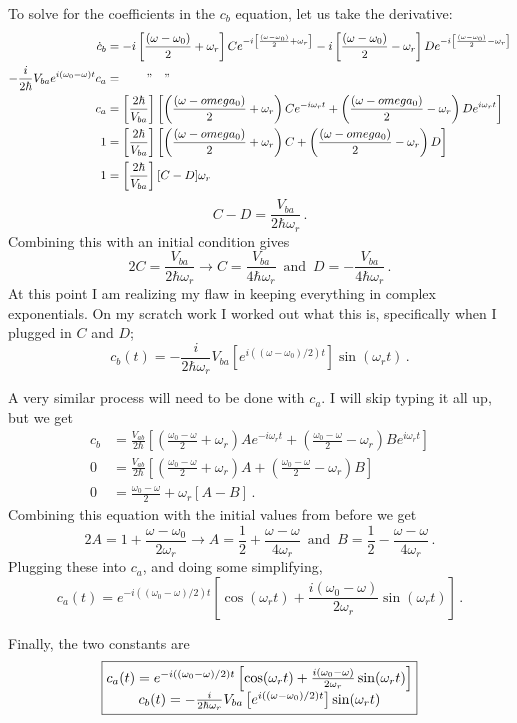 \documentclass[11pt]{article}
\begin{document}
\begin{enumerate}[label=\alph*)]
To solve for the coefficients in the $c_b$ equation, let us take the derivative: 
\begin{align*}
\dot{c}_b & = -i\left[\frac{(\omega - \omega_0)}{2} + \omega_r\right]Ce^{-i\left[\frac{(\omega - \omega_0)}{2} + \omega_r\right]} -i\left[\frac{(\omega - \omega_0)}{2} - \omega_r\right]De^{-i\left[\frac{(\omega - \omega_0)}{2} - \omega_r\right]}\\
-\frac{i}{2\hbar}V_{ba}e^{i(\omega_0-\omega)t}c_a & = \qquad " \quad "\\
c_a & = \left[\frac{2\hbar}{V_{ba}}\right]\left[\left(\frac{(\omega-omega_0)}{2} + \omega_r\right)Ce^{-i\omega_r t} + \left(\frac{(\omega-omega_0)}{2} - \omega_r\right)De^{i\omega_r t}\right]\\
1 & = \left[\frac{2\hbar}{V_{ba}}\right]\left[\left(\frac{(\omega-omega_0)}{2} + \omega_r\right)C + \left(\frac{(\omega-omega_0)}{2} - \omega_r\right)D\right]\\
1 & = \left[\frac{2\hbar}{V_{ba}}\right][C-D]\omega_r
\end{align*}
\[C - D = \frac{V_{ba}}{2\hbar \omega_r} \, .\]
Combining this with an initial condition gives
\[2C = \frac{V_{ba}}{2\hbar \omega_r} \rightarrow C = \frac{V_{ba}}{4\hbar \omega_r} \, \text{ and } \, D = -\frac{V_{ba}}{4\hbar \omega_r} \, .\]
At this point I am realizing my flaw in keeping everything in complex exponentials. On my scratch work I worked out what this is, specifically when I plugged in $C$ and $D$; 
\[c_b(t)  = -\frac{i}{2\hbar \omega_r}V_{ba} \left[e^{i((\omega-\omega_0)/2)t}\right]\sin(\omega_r t) \, .\]

A very similar process will need to be done with $c_a$. I will skip typing it all up, but we get
\begin{align*}
c_b & = \frac{V_{ab}}{2\hbar}\left[\left(\frac{\omega_0 - \omega}{2} + \omega_r\right)Ae^{-i\omega_r t} + \left(\frac{\omega_0 - \omega}{2} - \omega_r\right)Be^{i\omega_r t}\right]\\
0 & = \frac{V_{ab}}{2\hbar}\left[\left(\frac{\omega_0 - \omega}{2} + \omega_r\right)A + \left(\frac{\omega_0 - \omega}{2} - \omega_r\right)B\right]\\
0 & = \frac{\omega_0-\omega}{2}+ \omega_r[A-B] \, .
\end{align*}
Combining this equation with the initial values from before we get
\[2A = 1 + \frac{\omega-\omega_0}{2\omega_r} \rightarrow A = \frac{1}{2} + \frac{\omega-\omega}{4\omega_r} \, \text{ and } \, B = \frac{1}{2} - \frac{\omega-\omega}{4\omega_r} \, .\]
Plugging these into $c_a$, and doing some simplifying,
\[c_a(t) = e^{-i((\omega_0 - \omega)/2)t}\left[\cos(\omega_r t) + \frac{i(\omega_0 - \omega)}{2\omega_r}\sin(\omega_r t)\right] \, .\]

Finally, the two constants are 
\[\boxed{\mqty{c_a(t) = e^{-i((\omega_0 - \omega)/2)t}\left[\cos(\omega_r t) + \frac{i(\omega_0 - \omega)}{2\omega_r}\sin(\omega_r t)\right] \\ c_b(t)  = -\frac{i}{2\hbar \omega_r}V_{ba} \left[e^{i((\omega-\omega_0)/2)t}\right]\sin(\omega_r t)}}\]


\end{enumerate}
\end{document}
